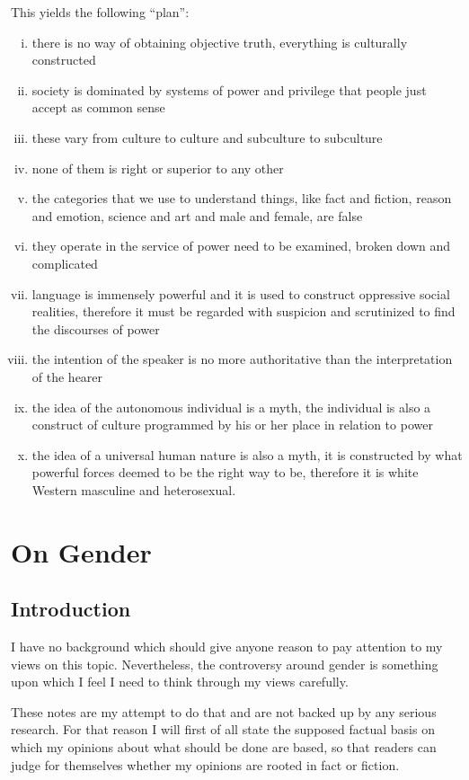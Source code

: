 \documentclass[10pt,titlepage]{book}
\begin{document}
This yields the following ``plan'':
     \begin{enumerate}[i)]
     \item there is no way of obtaining objective truth, everything is culturally constructed
     \item society is dominated by systems of power and privilege that people just accept as common sense
     \item these vary from culture to culture and subculture to subculture
     \item none of them is right or superior to any other
     \item the categories that we use to understand things, like fact and fiction, reason and emotion, science and art and male and female, are false
     \item they operate in the service of power need to be examined, broken down and complicated
     \item language is immensely powerful and it is used to construct oppressive social realities, therefore it must be regarded with suspicion and scrutinized to find the discourses of power
     \item the intention of the speaker is no more authoritative than the interpretation of the hearer
     \item the idea of the autonomous individual is a myth, the individual is also a construct of culture programmed by his or her place in relation to power
     \item the idea of a universal human nature is also a myth, it is constructed by what
powerful forces deemed to be the right way to be, therefore it is white Western masculine and heterosexual.
     \end{enumerate}

\chapter{On Gender}


\section{Introduction}

I have no background which should give anyone reason to pay attention to my views on this topic.
Nevertheless, the controversy around gender is something upon which I feel I need to think through my views carefully.

These notes are my attempt to do that and are not backed up by any serious research.
For that reason I will first of all state the supposed factual basis on which my opinions about what should be done are based, so that readers can judge for themselves whether my opinions are rooted in fact or fiction.
\end{document}
